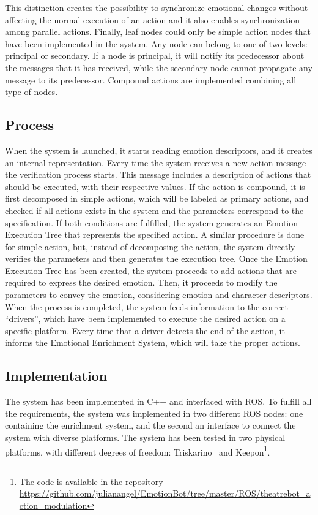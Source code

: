 \documentclass{sig-alternate-05-2015}
\begin{document}
This distinction creates the possibility to synchronize emotional changes without affecting the normal execution of an action and it also enables synchronization among parallel actions. Finally, leaf nodes could only be simple action nodes that have been implemented in the system. Any node can belong to one of two levels: principal or  secondary. If a node is principal, it will notify its predecessor about the messages that it has received, while the secondary node cannot propagate any message to its predecessor.%
Compound actions are implemented combining all type of nodes. 

\subsection{Process}

When the system is launched, it starts reading emotion descriptors, and it creates an internal representation. Every time the system receives a new action message the verification process starts. This message includes a description of actions that should be executed, with their respective values. If the action is compound, it is first decomposed in simple actions, which will be labeled as primary actions, and checked if all actions exists in the system and the parameters correspond to the specification. If both conditions are fulfilled, the system generates an Emotion Execution Tree that represents the specified action. A similar procedure is done for simple action, but, instead of decomposing the action, the system directly verifies the parameters and then generates the execution tree. Once the Emotion Execution Tree has been created, the system proceeds to add actions that are required to express the desired emotion. Then, it proceeds to modify the parameters to convey the emotion, considering emotion and character descriptors. When the process is completed, the system feeds information to the correct ``drivers'', which have been implemented to execute the desired action on a specific platform. Every time that a driver detects the end of the action, it informs the Emotional Enrichment System, which will take the proper actions.

\subsection{Implementation}

The system has been implemented in C++ and interfaced with ROS. To fulfill all the requirements, the system was implemented in two different ROS nodes: one containing the enrichment system, and the second an interface to connect the system with diverse platforms. The system has been tested in two physical platforms, with different degrees of freedom: Triskarino~\cite{angel2013} and Keepon\footnote{The code is available in the repository \url{https://github.com/julianangel/EmotionBot/tree/master/ROS/theatrebot_action_modulation}}. 
 
\end{document}
